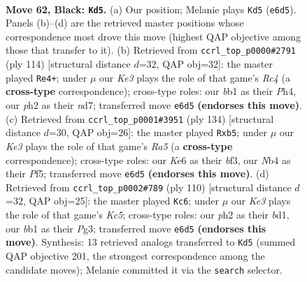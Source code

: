 \documentclass[11pt]{article}
\begin{document}
\clearpage

\begin{figure}[p]\centering
\begin{subfigure}{0.46\textwidth}\centering
\resizebox{\linewidth}{!}{%
\newchessgame
\chessboard[
  setfen={8/2r2p1p/4k1p1/4P3/bn3Pp1/8/3N2KP/1B6 b - - 15 62},
  showmover=false,
  pgfstyle=straightmove, color=movearrow, markmove={e6-d5}
]}
\caption{}
\end{subfigure}\hfill
\begin{subfigure}{0.46\textwidth}\centering
\resizebox{\linewidth}{!}{%
\newchessgame
\chessboard[
  setfen={8/3nb3/4k2p/8/1pR3PP/1P2pK2/4P3/8 w - - 5 58},
  showmover=false,
  pgfstyle=straightmove, color=movearrow, markmove={c4-e4}
]}
\caption{}
\end{subfigure}
\\[4pt]
\begin{subfigure}{0.46\textwidth}\centering
\resizebox{\linewidth}{!}{%
\newchessgame
\chessboard[
  setfen={8/2k3p1/5b1p/Rp3P1P/1P4P1/P2K1b2/8/8 w - - 0 68},
  showmover=false,
  pgfstyle=straightmove, color=movearrow, markmove={a5-b5}
]}
\caption{}
\end{subfigure}\hfill
\begin{subfigure}{0.46\textwidth}\centering
\resizebox{\linewidth}{!}{%
\newchessgame
\chessboard[
  setfen={2k5/8/p7/1pK1Bp1p/1P5P/P5P1/8/3b4 w - - 2 56},
  showmover=false,
  pgfstyle=straightmove, color=movearrow, markmove={c5-c6}
]}
\caption{}
\end{subfigure}
\caption{\textbf{Move 62, Black: \texttt{Kd5}.} (a) Our position; Melanie plays \texttt{Kd5} (\texttt{e6d5}). Panels (b)--(d) are the retrieved master positions whose correspondence most drove this move (highest QAP objective among those that transfer to it). (b) Retrieved from \texttt{ccrl\_top\_p0000\#2791} (ply 114) [structural distance $d$=32, QAP obj=32]: the master played \texttt{Re4+}; under $\mu$ our \emph{Ke3} plays the role of that game's \emph{Rc4} (a \textbf{cross-type} correspondence); cross-type roles: our \emph{b}b1 as their \emph{P}h4, our \emph{p}h2 as their \emph{n}d7; transferred move \texttt{e6d5} \textbf{(endorses this move)}. (c) Retrieved from \texttt{ccrl\_top\_p0001\#3951} (ply 134) [structural distance $d$=30, QAP obj=26]: the master played \texttt{Rxb5}; under $\mu$ our \emph{Ke3} plays the role of that game's \emph{Ra5} (a \textbf{cross-type} correspondence); cross-type roles: our \emph{K}e6 as their \emph{b}f3, our \emph{N}b4 as their \emph{P}f5; transferred move \texttt{e6d5} \textbf{(endorses this move)}. (d) Retrieved from \texttt{ccrl\_top\_p0002\#789} (ply 110) [structural distance $d$=32, QAP obj=25]: the master played \texttt{Kc6}; under $\mu$ our \emph{Ke3} plays the role of that game's \emph{Kc5}; cross-type roles: our \emph{p}h2 as their \emph{b}d1, our \emph{b}b1 as their \emph{P}g3; transferred move \texttt{e6d5} \textbf{(endorses this move)}. Synthesis: 13 retrieved analogs transferred to \texttt{Kd5} (summed QAP objective 201, the strongest correspondence among the candidate moves); Melanie committed it via the \texttt{search} selector.}
\label{fig:thought-m123}
\end{figure}
\end{document}
